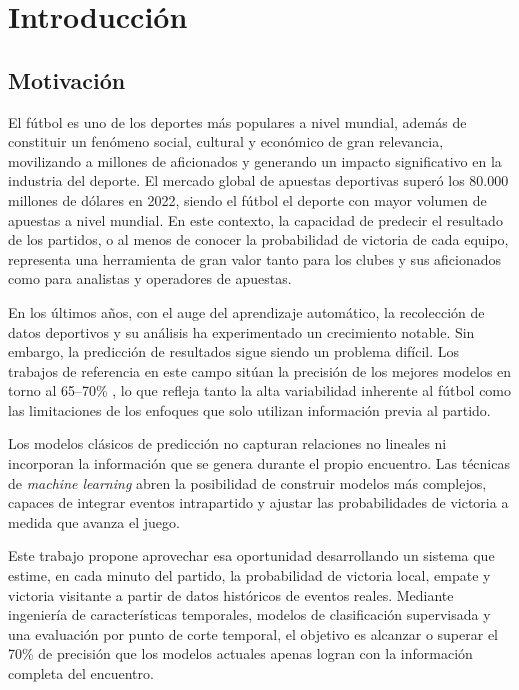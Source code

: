 \chapter{Introducción}
\section{Motivación}

El fútbol es uno de los deportes más populares a nivel mundial, además de constituir un fenómeno social, cultural y económico de gran relevancia, movilizando a millones de aficionados y generando un impacto significativo en la industria del deporte. El mercado global de apuestas deportivas superó los 80.000 millones de dólares en 2022, siendo el fútbol el deporte con mayor volumen de apuestas a nivel mundial. En este contexto, la capacidad de predecir el resultado de los partidos, o al menos de conocer la probabilidad de victoria de cada equipo, representa una herramienta de gran valor tanto para los clubes y sus aficionados como para analistas y operadores de apuestas.

En los últimos años, con el auge del aprendizaje automático, la recolección de datos deportivos y su análisis ha experimentado un crecimiento notable. Sin embargo, la predicción de resultados sigue siendo un problema difícil. Los trabajos de referencia en este campo sitúan la precisión de los mejores modelos en torno al 65--70\% \citep{baboota2019predictive, horvat2020review}, lo que refleja tanto la alta variabilidad inherente al fútbol como las limitaciones de los enfoques que solo utilizan información previa al partido.

Los modelos clásicos de predicción no capturan relaciones no lineales ni incorporan la información que se genera durante el propio encuentro. Las técnicas de \textit{machine learning} abren la posibilidad de construir modelos más complejos, capaces de integrar eventos intrapartido y ajustar las probabilidades de victoria a medida que avanza el juego.

Este trabajo propone aprovechar esa oportunidad desarrollando un sistema que estime, en cada minuto del partido, la probabilidad de victoria local, empate y victoria visitante a partir de datos históricos de eventos reales. Mediante ingeniería de características temporales, modelos de clasificación supervisada y una evaluación por punto de corte temporal, el objetivo es alcanzar o superar el 70\% de precisión que los modelos actuales apenas logran con la información completa del encuentro.

